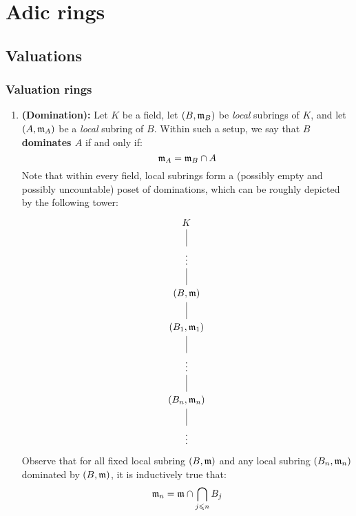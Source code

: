 \section{Adic rings}
    \subsection{Valuations}
        \subsubsection{Valuation rings}
            \begin{definition} \label{def: valuation_rings}
                \noindent
                \begin{enumerate}
                    \item \textbf{(Domination):} Let $K$ be a field, let $(B, \mathfrak{m}_B)$ be \textit{local} subrings of $K$, and let $(A, \mathfrak{m}_A)$ be a \textit{local} subring of $B$. Within such a setup, we say that \textbf{$B$ dominates $A$} if and only if:
                        $$\mathfrak{m}_A = \mathfrak{m}_B \cap A$$
                    Note that within every field, local subrings form a (possibly empty and possibly uncountable) poset of dominations, which can be roughly depicted by the following tower:
                        $$
                            \begin{tikzcd}
                            	K \\
                            	\vdots \\
                            	{(B, \m)} \\
                            	{(B_1, \m_1)} \\
                            	\vdots \\
                            	{(B_n, \m_n)} \\
                            	\vdots
                            	\arrow[no head, from=5-1, to=4-1]
                            	\arrow[no head, from=6-1, to=5-1]
                            	\arrow[no head, from=7-1, to=6-1]
                            	\arrow[no head, from=3-1, to=2-1]
                            	\arrow[no head, from=2-1, to=1-1]
                            	\arrow[no head, from=4-1, to=3-1]
                            \end{tikzcd}
                        $$
                    Observe that for all fixed local subring $(B, \mathfrak{m})$ and any local subring $(B_n, \mathfrak{m}_n)$ dominated by $(B, \mathfrak{m})$, it is inductively true that:
                        $$\mathfrak{m}_n = \mathfrak{m} \cap \bigcap_{j \leqslant n} B_j$$

\end{enumerate}
\end{definition}
